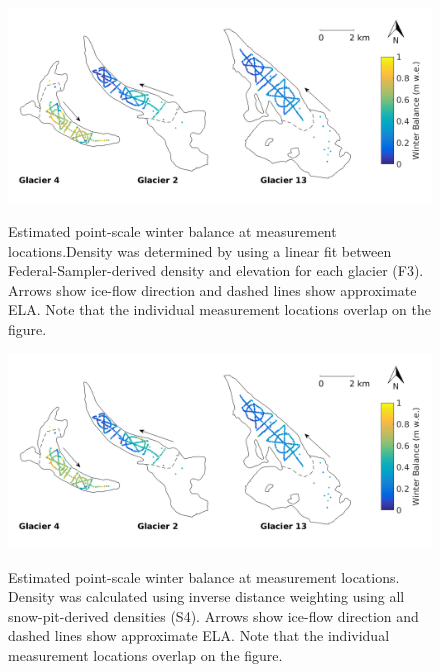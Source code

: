 \documentclass{sfuthesis}
\begin{document}
\begin{figure}[H]
	\centering
	\includegraphics[width = \textwidth]{SWEmap_opt7.png}\\
	\caption{Estimated point-scale winter balance at measurement locations.Density was determined by using a linear fit between Federal-Sampler-derived density and elevation for each glacier (F3). Arrows show ice-flow direction and dashed lines show approximate ELA. Note that the individual measurement locations overlap on the figure.}
	\label{fig:SWEmap_F3}
\end{figure}

\begin{figure}[H]
	\centering
	\includegraphics[width = \textwidth]{SWEmap_opt8.png}\\
	\caption{Estimated point-scale winter balance at measurement locations. Density was calculated using inverse distance weighting using all snow-pit-derived densities (S4). Arrows show ice-flow direction and dashed lines show approximate ELA. Note that the individual measurement locations overlap on the figure.}
	\label{fig:SWEmap_S4}
\end{figure}
\end{document}
